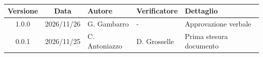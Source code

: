 \\[0.5cm]

\renewcommand{\arraystretch}{1.3}
\noindent\begin{tabularx}{\textwidth}{|c|c|>{\raggedright\arraybackslash}p{2.8cm}|>{\raggedright\arraybackslash}p{2.8cm}|X|}
    \hline
    \textbf{Versione} & \textbf{Data} & \textbf{Autore} & \textbf{Verificatore} & \textbf{Dettaglio} \\
    \hline
    1.0.0 & 2026/11/26 & G. Gambarro & - & Approvazione verbale \\
    \hline
    0.0.1 & 2026/11/25 & C. Antoniazzo & D. Grosselle & Prima stesura documento \\
    \hline
\end{tabularx}
\newpage
